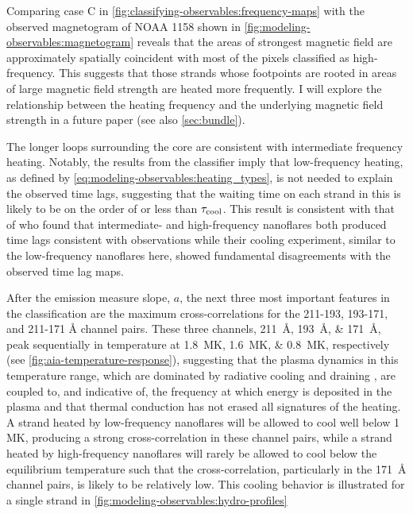 Comparing case C in \autoref{fig:classifying-observables:frequency-maps} with the observed magnetogram of NOAA 1158 shown in \autoref{fig:modeling-observables:magnetogram} reveals that the areas of strongest magnetic field are approximately spatially coincident with most of the pixels classified as high-frequency. This suggests that those strands whose footpoints are rooted in areas of large magnetic field strength are heated more frequently. I will explore the relationship between the heating frequency and the underlying magnetic field strength in a future paper (see also \autoref{sec:bundle}).

The longer loops surrounding the core are consistent with intermediate frequency heating. Notably, the results from the classifier imply that low-frequency heating, as defined by \autoref{eq:modeling-observables:heating_types}, is not needed to explain the observed time lags, suggesting that the waiting time on each strand in this \AR{} is likely to be on the order of or less than $\tau_\textup{cool}$. This result is consistent with that of \citet{bradshaw_patterns_2016} who found that intermediate- and high-frequency nanoflares both produced time lags consistent with observations while their cooling experiment, similar to the low-frequency nanoflares here, showed fundamental disagreements with the observed time lag maps.

After the emission measure slope, $a$, the next three most important features in the classification are the maximum cross-correlations for the 211-193, 193-171, and 211-171 \si{\angstrom} channel pairs. These three channels, \SIlist{211;193;171}{\angstrom}, peak sequentially in temperature at \SIlist{1.8;1.6;0.8}{\mega\kelvin}, respectively (see \autoref{fig:aia-temperature-response}), suggesting that the plasma dynamics in this temperature range, which are dominated by radiative cooling and draining \citep[e.g.][]{bradshaw_cooling_2005,bradshaw_cooling_2010,bradshaw_new_2010}, are coupled to, and indicative of, the frequency at which energy is deposited in the plasma and that thermal conduction has not erased all signatures of the heating. A strand heated by low-frequency nanoflares will be allowed to cool well below 1 MK, producing a strong cross-correlation in these channel pairs, while a strand heated by high-frequency nanoflares will rarely be allowed to cool below the equilibrium temperature such that the cross-correlation, particularly in the \SI{171}{\angstrom} channel pairs, is likely to be relatively low. This cooling behavior is illustrated for a single strand in \autoref{fig:modeling-observables:hydro-profiles}

